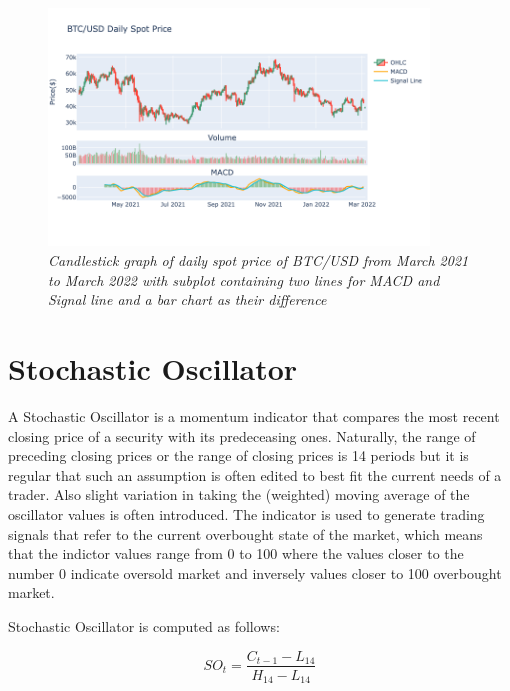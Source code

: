 \begin{figure}[ht]

\begin{center}
	\includegraphics[width=0.9\textwidth]{MACD.png}
\end{center}

\caption{\textit{ Candlestick graph of daily spot price of BTC/USD from March 2021 to March 2022 with subplot containing two lines for MACD and Signal line and a bar chart as their difference}}

\end{figure}

\section{Stochastic Oscillator}

	A Stochastic Oscillator is a momentum indicator that compares the most recent closing price of a security with its predeceasing ones. Naturally, the range of preceding closing prices or the range of closing prices is 14 periods but it is regular that such an assumption is often edited to best fit the current needs of a trader. Also slight variation in taking the (weighted) moving average of the oscillator values is often introduced. The indicator is used to generate trading signals that refer to the current overbought state of the market, which means that the indictor values range from 0 to 100 where the values closer to the number 0 indicate oversold market and inversely values closer to 100 overbought market. 
	
Stochastic Oscillator is computed as follows:

\begin{equation}
SO_{t} = \frac{C_{t-1} - L_{14}}{H_{14} - L_{14}}
\end{equation}

